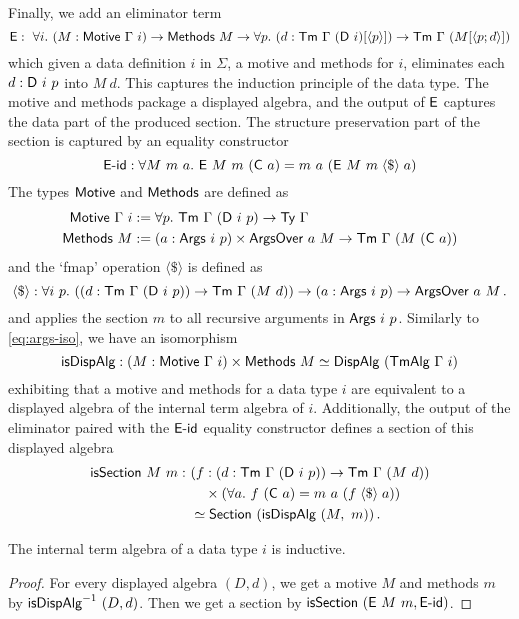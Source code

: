 Finally, we add an eliminator term
\[
	\mta{E} :\ \forall i.\ (M : \mta{Motive}\ \Gamma\ i) \to \mta{Methods}\ M \to \forall p.\ (d : \Tm\ \Gamma\ (\mta{D}\ i)[\Msub p]) \to \Tm\ \Gamma\ (M[\Msub{p; d}]) \\
\]
which given a data definition $i$ in $\Sigma$, a motive and methods for $i$,
eliminates each $d : \textsf{D}\ i\ p$ into $M\ d$. This captures the induction
principle of the data type. The motive and methods package a displayed algebra,
and the output of $\textsf{E}$ captures the data part of the produced section. The
structure preservation part of the section is captured by an equality
constructor
\[
	\mta{E-id} : \forall M\ m\ a.\ \mta{E}\ M\ m\ (\mta{C}\ a) = m\ a\ (\mta{E}\ M\ m \fmap a)
\]
The types $\textsf{Motive}$ and $\textsf{Methods}$ are defined as
\begin{align*}
	\mta{Motive}\ \Gamma\ i & := \forall p.\ \Tm\ \Gamma\ (\mta{D}\ i\ p) \to \Ty\ \Gamma                               \\
	\mta{Methods}\ M        & := (a : \mta{Args}\ i\ p) \times \mta{ArgsOver}\ a\ M \to  \Tm\ \Gamma\ (M\ (\mta{C}\ a))
\end{align*}
and the `fmap' operation $\langle\$\rangle$ is defined as
\[
	\langle\$\rangle : \forall i\ p.\ ((d : \Tm\ \Gamma\ (\mta{D}\ i\ p)) \to \Tm\ \Gamma\ (M\ d)) \to (a : \mta{Args}\ i\ p) \to \mta{ArgsOver}\ a\ M \,.
\]
and applies the section $m$ to all recursive arguments in $\mta{Args}\ i\ p$.
Similarly to \eqref{eq:args-iso}, we have an isomorphism
\begin{equation}
	\mta{isDispAlg} : (M : \mta{Motive}\ \Gamma\ i) \times \mta{Methods}\ M \simeq \mta{DispAlg}\ (\mta{TmAlg}\ \Gamma\ i)
\end{equation}
exhibiting that a motive and methods for a data type $i$ are equivalent to a
displayed algebra of the internal term algebra of $i$.
Additionally, the output of the eliminator paired with the $\textsf{E-id}$ equality
constructor defines a section of this displayed algebra
\begin{align*}
	\mta{isSection}\ M\ m :\  & (f : (d : \Tm\ \Gamma\ (\mta{D}\ i\ p)) \to \Tm\ \Gamma\ (M\ d)) \\
	                          & \quad\times (\forall a.\ f\ (\mta{C}\ a) = m\ a\ (f \fmap a))    \\
	                          & \simeq \mta{Section}\ (\mta{isDispAlg}\ (M,\ m)) \,.
\end{align*}

\begin{lemma}
	The internal term algebra of a data type $i$ is inductive.
	\begin{proof}
		For every displayed algebra $(D, d)$, we get a motive $M$ and methods $m$ by
		$\textsf{isDispAlg}^{-1}\ (D, d)$. Then we get a section by $\mta{isSection}\ (\mta{E}\ M\ m, \mta{E-id})$.
	\end{proof}
\end{lemma}

